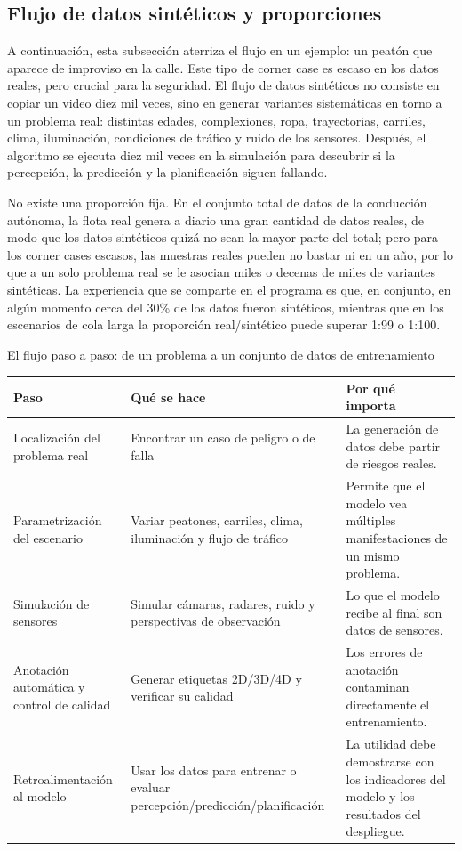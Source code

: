 \subsection{Flujo de datos sintéticos y proporciones}

A continuación, esta subsección aterriza el flujo en un ejemplo: un peatón que aparece de improviso en la calle. Este tipo de corner case es escaso en los datos reales, pero crucial para la seguridad. El flujo de datos sintéticos no consiste en copiar un video diez mil veces, sino en generar variantes sistemáticas en torno a un problema real: distintas edades, complexiones, ropa, trayectorias, carriles, clima, iluminación, condiciones de tráfico y ruido de los sensores. Después, el algoritmo se ejecuta diez mil veces en la simulación para descubrir si la percepción, la predicción y la planificación siguen fallando.

No existe una proporción fija. En el conjunto total de datos de la conducción autónoma, la flota real genera a diario una gran cantidad de datos reales, de modo que los datos sintéticos quizá no sean la mayor parte del total; pero para los corner cases escasos, las muestras reales pueden no bastar ni en un año, por lo que a un solo problema real se le asocian miles o decenas de miles de variantes sintéticas. La experiencia que se comparte en el programa es que, en conjunto, en algún momento cerca del 30\% de los datos fueron sintéticos, mientras que en los escenarios de cola larga la proporción real/sintético puede superar 1:99 o 1:100.

\begin{knowledgebox}{El flujo paso a paso: de un problema a un conjunto de datos de entrenamiento}
\begin{tabularx}{\textwidth}{p{}p{}X}
\toprule
Paso & Qué se hace & Por qué importa \\
\midrule
Localización del problema real & Encontrar un caso de peligro o de falla & La generación de datos debe partir de riesgos reales. \\
Parametrización del escenario & Variar peatones, carriles, clima, iluminación y flujo de tráfico & Permite que el modelo vea múltiples manifestaciones de un mismo problema. \\
Simulación de sensores & Simular cámaras, radares, ruido y perspectivas de observación & Lo que el modelo recibe al final son datos de sensores. \\
Anotación automática y control de calidad & Generar etiquetas 2D/3D/4D y verificar su calidad & Los errores de anotación contaminan directamente el entrenamiento. \\
Retroalimentación al modelo & Usar los datos para entrenar o evaluar percepción/predicción/planificación & La utilidad debe demostrarse con los indicadores del modelo y los resultados del despliegue. \\
\bottomrule
\end{tabularx}
\end{knowledgebox}

